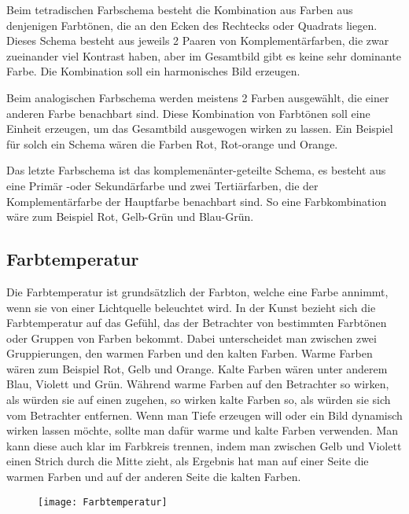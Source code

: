 Beim tetradischen Farbschema besteht die Kombination aus Farben aus denjenigen Farbtönen, die an den Ecken des Rechtecks oder Quadrats liegen. Dieses Schema besteht aus jeweils 2 Paaren von Komplementärfarben, die zwar zueinander viel Kontrast haben, aber im Gesamtbild gibt es keine sehr dominante Farbe. Die Kombination soll ein harmonisches Bild erzeugen.

Beim analogischen Farbschema werden meistens 2 Farben ausgewählt, die einer anderen Farbe benachbart sind. Diese Kombination von Farbtönen soll eine Einheit erzeugen, um das Gesamtbild ausgewogen wirken zu lassen. Ein Beispiel für solch ein Schema wären die Farben Rot, Rot-orange und Orange.

Das letzte Farbschema ist das komplemenänter-geteilte Schema, es besteht aus eine Primär -oder Sekundärfarbe und zwei Tertiärfarben, die der Komplementärfarbe der Hauptfarbe benachbart sind. So eine Farbkombination wäre zum Beispiel Rot, Gelb-Grün und Blau-Grün.
\cite{day2013line}

\subsection{Farbtemperatur}
Die Farbtemperatur ist grundsätzlich der Farbton, welche eine Farbe annimmt, wenn sie von einer Lichtquelle beleuchtet wird. In der Kunst bezieht sich die Farbtemperatur auf das Gefühl, das der Betrachter von bestimmten Farbtönen oder Gruppen von Farben bekommt. Dabei unterscheidet man zwischen zwei Gruppierungen, den warmen Farben und den kalten Farben. Warme Farben wären zum Beispiel Rot, Gelb und Orange. Kalte Farben wären unter anderem Blau, Violett und Grün. Während warme Farben auf den Betrachter so wirken, als würden sie auf einen zugehen, so wirken kalte Farben so, als würden sie sich vom Betrachter entfernen. Wenn man Tiefe erzeugen will oder ein Bild dynamisch wirken lassen möchte, sollte man dafür warme und kalte Farben verwenden. Man kann diese auch klar im Farbkreis trennen, indem man zwischen Gelb und Violett einen Strich durch die Mitte zieht, als Ergebnis hat man auf einer Seite die warmen Farben und auf der anderen Seite die kalten Farben.
\cite{mollica2018special}

\begin{figure}[H]
	\centering
	\texttt{[image: Farbtemperatur]}
	\caption{\cite{mollica2018special}}
\end{figure}

